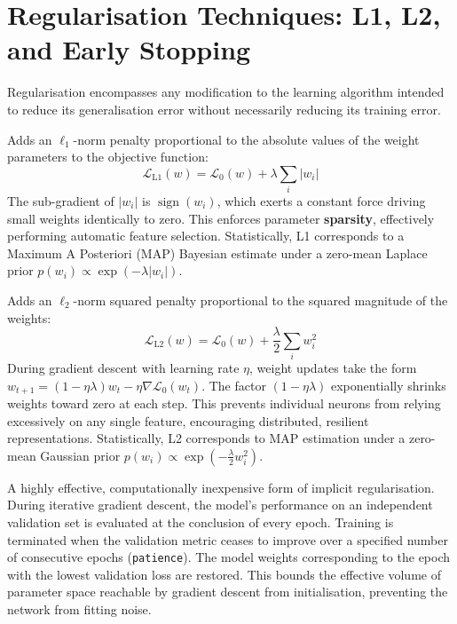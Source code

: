 \documentclass[12pt,a4paper]{article}
\begin{document}
\section{Regularisation Techniques: L1, L2, and Early Stopping}
Regularisation encompasses any modification to the learning algorithm intended to reduce its generalisation error without necessarily reducing its training error.

\begin{description}[leftmargin=2.2cm]
\item[L1 Regularisation (Lasso):] Adds an $\ell_1$-norm penalty proportional to the absolute values of the weight parameters to the objective function:
\begin{equation}
\mathcal{L}_{\text{L1}}(w) = \mathcal{L}_0(w) + \lambda \sum_{i} |w_i|
\end{equation}
The sub-gradient of $|w_i|$ is $\operatorname{sign}(w_i)$, which exerts a constant force driving small weights identically to zero. This enforces parameter \textbf{sparsity}, effectively performing automatic feature selection. Statistically, L1 corresponds to a Maximum A Posteriori (MAP) Bayesian estimate under a zero-mean Laplace prior $p(w_i) \propto \exp(-\lambda |w_i|)$.

\item[L2 Regularisation (Ridge / Weight Decay):] Adds an $\ell_2$-norm squared penalty proportional to the squared magnitude of the weights:
\begin{equation}
\mathcal{L}_{\text{L2}}(w) = \mathcal{L}_0(w) + \frac{\lambda}{2} \sum_{i} w_i^2
\end{equation}
During gradient descent with learning rate $\eta$, weight updates take the form $w_{t+1} = (1 - \eta \lambda)w_t - \eta \nabla \mathcal{L}_0(w_t)$. The factor $(1 - \eta \lambda)$ exponentially shrinks weights toward zero at each step. This prevents individual neurons from relying excessively on any single feature, encouraging distributed, resilient representations. Statistically, L2 corresponds to MAP estimation under a zero-mean Gaussian prior $p(w_i) \propto \exp(-\frac{\lambda}{2} w_i^2)$.

\item[Early Stopping:] A highly effective, computationally inexpensive form of implicit regularisation. During iterative gradient descent, the model's performance on an independent validation set is evaluated at the conclusion of every epoch. Training is terminated when the validation metric ceases to improve over a specified number of consecutive epochs (\texttt{patience}). The model weights corresponding to the epoch with the lowest validation loss are restored. This bounds the effective volume of parameter space reachable by gradient descent from initialisation, preventing the network from fitting noise.
\end{description}
\end{document}
